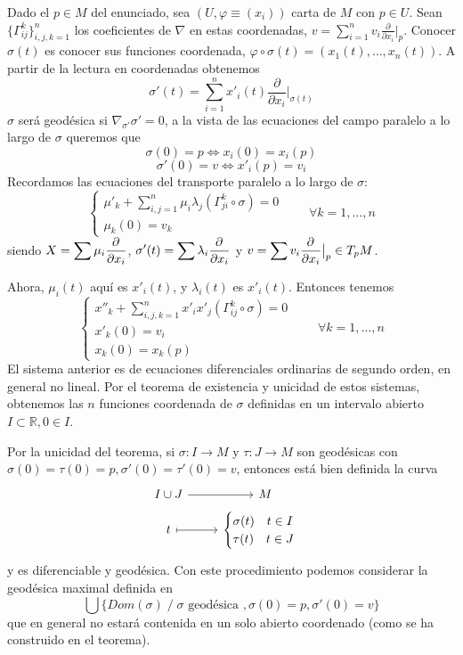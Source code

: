 \begin{dem}
    Dado el $p \in M$ del enunciado, sea $(U,\varphi\equiv(x_i))$ carta de $M$ con $p \in U$. Sean $\{\Gamma_{ij}^k\}_{i,j,k=1}^n$ los coeficientes de $\nabla$ en estas coordenadas, $\displaystyle v=\sum_{i=1}^n v_i \frac{\partial}{\partial x_i} \big|_p$. Conocer $\sigma(t)$ es conocer sus funciones coordenada, $\varphi \circ \sigma (t) = (x_1(t),\dots,x_n(t))$. A partir de la lectura en coordenadas obtenemos
    $$\sigma'(t) = \sum_{i=1}^n x'_i(t) \dfrac{\partial}{\partial x_i}\Big|_{\sigma(t)}$$
    $\sigma$ será geodésica si $\nabla_{\sigma'} \sigma' = 0$, a la vista de las ecuaciones del campo paralelo a lo largo de $\sigma$ queremos que  $$\sigma(0) = p \iff x_i(0) = x_i(p)$$ $$\sigma'(0) = v \iff x'_i(p) = v_i$$
    Recordamos las ecuaciones del transporte paralelo a lo largo de $\sigma$:
    $$\begin{cases}
        \displaystyle \mu'_k+\sum_{i,j=1}^n \mu_i \lambda_j \left( \Gamma_{ji}^k \circ \sigma\right)=0 \\[3mm]  \mu_k(0)=v_k  \end{cases} \qquad \forall k =1,\ldots, n$$
        siendo $\displaystyle X = \sum \mu_i \dfrac{\partial^{} }{\partial x_i}$, $\displaystyle \sigma'(t) = \sum\lambda_i \dfrac{\partial^{} }{\partial x_i}$ y $\displaystyle v = \sum v_i \dfrac{\partial^{} }{\partial x_i} \big|_p \in T_pM$. 
        
        Ahora, $\mu_i(t)$ aquí es $x'_i(t)$, y $\lambda_i(t)$ es $x'_i(t)$. 
    Entonces tenemos $$\begin{cases}
        \displaystyle x''_k + \sum_{i,j,k = 1}^n x'_i x'_j \left(\Gamma_{ij}^k \circ \sigma\right) = 0\\[3mm]
        x'_k(0) = v_i \\
        x_k(0) = x_k(p)
    \end{cases} \qquad \forall k =1,\ldots, n$$
    El sistema anterior es de ecuaciones diferenciales ordinarias de segundo orden, en general no lineal. Por el teorema de existencia y unicidad de estos sistemas, obtenemos las $n$ funciones coordenada de $\sigma$ definidas en un intervalo abierto $I \subset \mathbb R, 0\in I$.
\end{dem}
\begin{obs}
    Por la unicidad del teorema, si $\sigma: I \to M$ y $\tau: J \to M$ son geodésicas con $\sigma(0) = \tau(0) = p, \sigma'(0) = \tau'(0) = v$, entonces está bien definida la curva $$\begin{tikzcd}
        I \cup J \rar & M\\[-5mm]
        t \arrow[mapsto]{r} &\begin{cases}
            \sigma(t) \quad t\in I\\
            \tau(t) \quad t \in J
        \end{cases} 
    \end{tikzcd}$$
    y es diferenciable y geodésica. Con este procedimiento podemos considerar la geodésica maximal definida en $$\bigcup\{Dom(\sigma) \;/ \; \sigma \text{ geodésica }, \sigma(0) = p, \sigma'(0) = v\}$$
    que en general no estará contenida en un solo abierto coordenado (como se ha construido en el teorema).
\end{obs}

